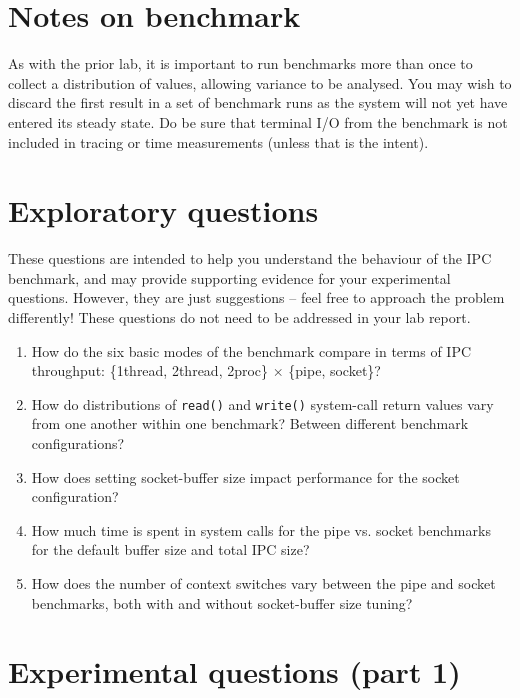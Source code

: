 \documentclass[a4paper,10pt]{article}
\begin{document}
\section*{Notes on benchmark}

As with the prior lab, it is important to run benchmarks more than once to
collect a distribution of values, allowing variance to be analysed.
You may wish to discard the first result in a set of benchmark runs as the
system will not yet have entered its steady state.
Do be sure that terminal I/O from the benchmark is not included in tracing or
time measurements (unless that is the intent).

\section*{Exploratory questions}

These questions are intended to help you understand the behaviour of the IPC
benchmark, and may provide supporting evidence for your experimental
questions.
However, they are just suggestions -- feel free to approach the problem
differently!
These questions do not need to be addressed in your lab report.

\begin{enumerate}
  \item How do the six basic modes of the benchmark compare in terms of
    IPC throughput: \{1thread, 2thread, 2proc\} $\times$ \{pipe, socket\}?
  \item How do distributions of \texttt{read()} and \texttt{write()}
    system-call return values vary from one another within one benchmark?
    Between different benchmark configurations?
  \item How does setting socket-buffer size impact performance for the
    socket configuration?
  \item How much time is spent in system calls for the pipe vs. socket
    benchmarks for the default buffer size and total IPC size?
  \item How does the number of context switches vary between the pipe and
    socket benchmarks, both with and without socket-buffer size tuning?
\end{enumerate}

\section*{Experimental questions (part 1)}
\end{document}
